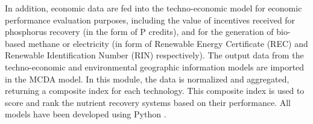 \documentclass[authoryear]{elsarticle}
\begin{document}
In addition, economic data are fed into the techno-economic model for economic performance evaluation purposes, including the value of incentives received for phosphorus recovery (in the form of P credits), and for the generation of bio-based methane or electricity (in form of Renewable Energy Certificate (REC) and Renewable Identification Number (RIN) respectively).
The output data from the techno-economic and environmental geographic information models are imported in the
MCDA model. 
In this module, the data is normalized and aggregated, returning a composite index for each technology. This composite index is used to score and rank the nutrient recovery systems based on their performance. All models have been developed using Python \citep{Python}.
\end{document}
